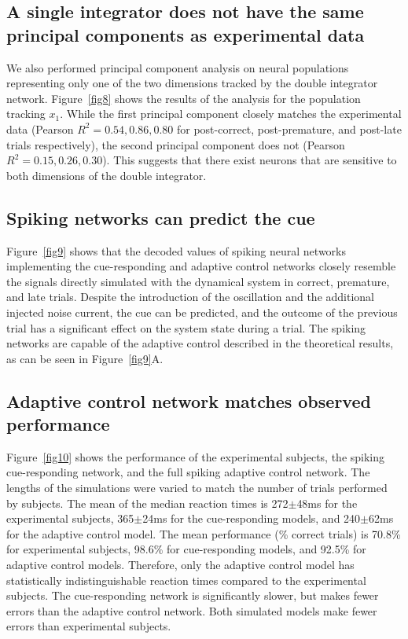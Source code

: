 \documentclass[11pt]{article}
\begin{document}
\subsection{A single integrator does not have the same principal components as experimental data}

We also performed principal component analysis
on neural populations representing only one
of the two dimensions tracked by
the double integrator network.
Figure~\ref{fig8}
shows the results of the analysis
for the population tracking $x_1$.
While the first principal component
closely matches the experimental data
(Pearson $R^2 = 0.54, 0.86, 0.80$
for post-correct, post-premature, and post-late
trials respectively),
the second principal component
does not (Pearson $R^2 = 0.15, 0.26, 0.30$).
This suggests that there exist
neurons that are sensitive
to both dimensions of the double integrator.

\subsection{Spiking networks can predict the cue}

Figure~\ref{fig9} shows that
the decoded values of spiking neural networks
implementing the cue-responding
and adaptive control networks
closely resemble the signals
directly simulated with
the dynamical system
in correct, premature, and late trials.
Despite the introduction of the oscillation
and the additional injected noise current,
the cue can be predicted,
and the outcome of the previous trial
has a significant effect
on the system state during a trial.
The spiking networks are capable
of the adaptive control described
in the theoretical results,
as can be seen in Figure~\ref{fig9}A.

\subsection{Adaptive control network matches observed performance}

Figure~\ref{fig10} shows the performance
of the experimental subjects,
the spiking cue-responding network,
and the full spiking adaptive control network.
The lengths of the simulations were
varied to match the number of trials
performed by subjects.
The mean of the median reaction times
is 272$\pm$48ms for the experimental subjects,
365$\pm$24ms for the cue-responding models,
and 240$\pm$62ms for the adaptive control model.
The mean performance (\% correct trials) is
70.8\% for experimental subjects,
98.6\% for cue-responding models,
and 92.5\% for adaptive control models.
Therefore, only the adaptive control model
has statistically indistinguishable reaction times
compared to the experimental subjects.
The cue-responding network is significantly slower,
but makes fewer errors than the adaptive control network.
Both simulated models make fewer errors
than experimental subjects.
\end{document}
